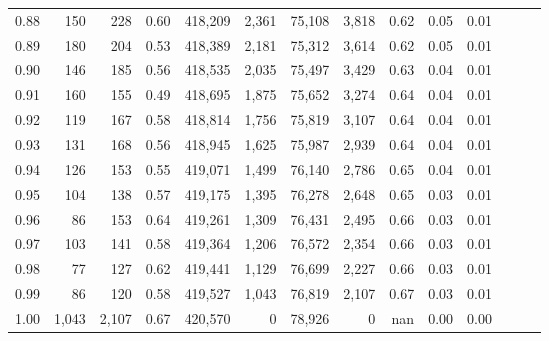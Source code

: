 \begin{tabular}{rrrrrrrrrrrrrr}
0.88 &     150 &    228 &  0.60 &  418,209 &    2,361 &  75,108 &   3,818 &  0.62 &  0.05 &      0.01 \\
0.89 &     180 &    204 &  0.53 &  418,389 &    2,181 &  75,312 &   3,614 &  0.62 &  0.05 &      0.01 \\
0.90 &     146 &    185 &  0.56 &  418,535 &    2,035 &  75,497 &   3,429 &  0.63 &  0.04 &      0.01 \\
0.91 &     160 &    155 &  0.49 &  418,695 &    1,875 &  75,652 &   3,274 &  0.64 &  0.04 &      0.01 \\
0.92 &     119 &    167 &  0.58 &  418,814 &    1,756 &  75,819 &   3,107 &  0.64 &  0.04 &      0.01 \\
0.93 &     131 &    168 &  0.56 &  418,945 &    1,625 &  75,987 &   2,939 &  0.64 &  0.04 &      0.01 \\
0.94 &     126 &    153 &  0.55 &  419,071 &    1,499 &  76,140 &   2,786 &  0.65 &  0.04 &      0.01 \\
0.95 &     104 &    138 &  0.57 &  419,175 &    1,395 &  76,278 &   2,648 &  0.65 &  0.03 &      0.01 \\
0.96 &      86 &    153 &  0.64 &  419,261 &    1,309 &  76,431 &   2,495 &  0.66 &  0.03 &      0.01 \\
0.97 &     103 &    141 &  0.58 &  419,364 &    1,206 &  76,572 &   2,354 &  0.66 &  0.03 &      0.01 \\
0.98 &      77 &    127 &  0.62 &  419,441 &    1,129 &  76,699 &   2,227 &  0.66 &  0.03 &      0.01 \\
0.99 &      86 &    120 &  0.58 &  419,527 &    1,043 &  76,819 &   2,107 &  0.67 &  0.03 &      0.01 \\
1.00 &   1,043 &  2,107 &  0.67 &  420,570 &        0 &  78,926 &       0 &   nan &  0.00 &      0.00 \\
\bottomrule
\end{tabular}
